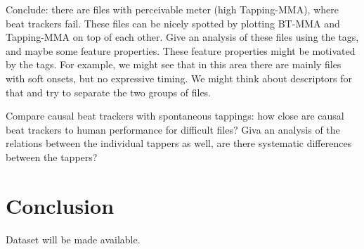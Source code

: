 \documentclass[10pt,journal,final,twocolumn,twoside]{IEEEtran}
\begin{document}
Conclude: there are files with perceivable meter (high Tapping-MMA), where beat trackers fail. These files can be nicely spotted by plotting BT-MMA and Tapping-MMA on top of each other. Give an analysis of these files using the tags, and maybe some feature properties. These feature properties might be motivated by the tags. For example, we might see that in this area there are mainly files with soft onsets, but no expressive timing. We might think about descriptors for that and try to separate the two groups of files.  

Compare causal beat trackers with spontaneous tappings: how close are causal beat trackers to human performance for difficult files? Giva an analysis of the relations between the individual tappers as well, are there systematic differences between the tappers?


\section{Conclusion}
Dataset will be made available.
\label{app:BT_list}








%


\end{document}
